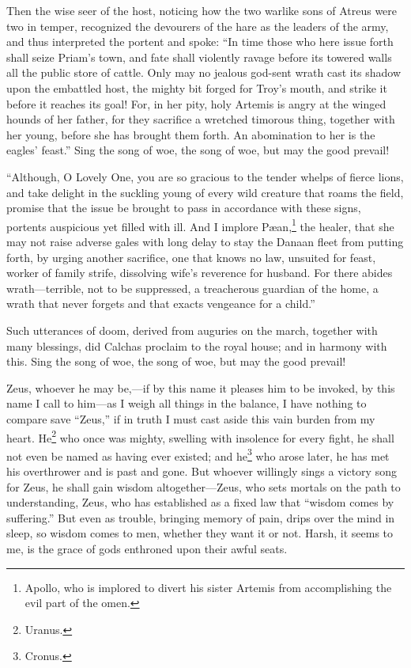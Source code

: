\documentclass[12pt]{article}
\begin{document}
Then the wise seer of the host, noticing how the two warlike sons of Atreus were two in temper, recognized the devourers of the hare as the leaders of the army, and thus interpreted the portent and spoke: ``In time those who here issue forth shall seize Priam's town, and fate shall violently ravage before its towered walls all the public store of cattle. Only may no jealous god-sent wrath cast its shadow upon the embattled host, the mighty bit forged for Troy's mouth, and strike it before it reaches its goal! For, in her pity, holy Artemis is angry at the winged hounds of her father, for they sacrifice a wretched timorous thing, together with her young, before she has brought them forth. An abomination to her is the eagles' feast.'' Sing the song of woe, the song of woe, but may the good prevail!

``Although, O Lovely One, you are so gracious to the tender whelps of fierce lions, and take delight in the suckling young of every wild creature that roams the field, promise that the issue be brought to pass in accordance with these signs, portents auspicious yet filled with ill. And I implore P{\ae}an,\footnote{Apollo, who is implored to divert his sister Artemis from accomplishing the evil part of the omen.} the healer, that she may not raise adverse gales with long delay to stay the Danaan fleet from putting forth, by urging another sacrifice, one that knows no law, unsuited for feast, worker of family strife, dissolving wife's reverence for husband. For there abides wrath---terrible, not to be suppressed, a treacherous guardian of the home, a wrath that never forgets and that exacts vengeance for a child.''

Such utterances of doom, derived from auguries on the march, together with many blessings, did Calchas proclaim to the royal house; and in harmony with this. Sing the song of woe, the song of woe, but may the good prevail!

Zeus, whoever he may be,---if by this name it pleases him to be invoked, by this name I call to him---as I weigh all things in the balance, I have nothing to compare save ``Zeus,'' if in truth I must cast aside this vain burden from my heart. He\footnote{Uranus.} who once was mighty, swelling with insolence for every fight, he shall not even be named as having ever existed; and he\footnote{Cronus.} who arose later, he has met his overthrower and is past and gone. But whoever willingly sings a victory song for Zeus, he shall gain wisdom altogether---Zeus, who sets mortals on the path to understanding, Zeus, who has established as a fixed law that ``wisdom comes by suffering.'' But even as trouble, bringing memory of pain, drips over the mind in sleep, so wisdom comes to men, whether they want it or not. Harsh, it seems to me, is the grace of gods enthroned upon their awful seats.
\end{document}
